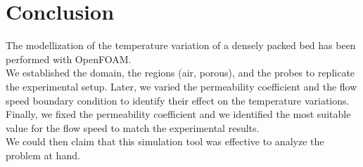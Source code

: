 
\section{Conclusion}
\label{section:cnclusion}

The modellization of the temperature variation of a densely packed bed 
has been performed with OpenFOAM\textregistered.\\
We established the domain, the regions (air, porous), and the probes
to replicate the experimental setup.
Later, we varied the permeability coefficient and the flow speed boundary
condition to identify their effect on the temperature variations.
Finally, we fixed the permeability coefficient and we identified the most
suitable value for the flow speed to match the experimental results.\\
We could then claim that this simulation tool was effective to analyze the
problem at hand.
